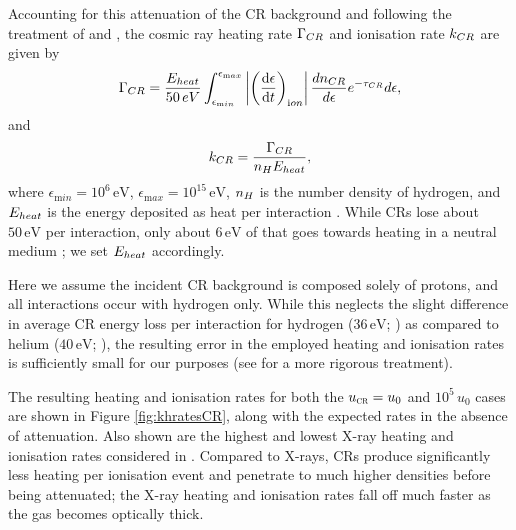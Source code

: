 \documentclass{thesis}
\newcommand{\ev}{\ensuremath{\,\mathrm{eV}}\xspace}
\newcommand{\ucr}{\ensuremath{{u}_{\textsc{cr}}}\xspace}
\begin{document}
Accounting for this attenuation of the CR background and following the treatment of \citet{StacyBromm2007} and \citet{InayoshiOmukai2011}, the cosmic ray heating rate $\Gamma_{\mathrm \small CR}$ and ionisation rate $k_{\mathrm \small CR}$ are given by
\begin{equation}
\Gamma_{\mathrm \small CR} = 
    \frac{ E_{\mathrm \small heat}}{50\,{\mathrm \small eV}} 
    \int_{\epsilon_{\mathrm min}}^{\epsilon_{\mathrm max}} 
    \left| \left( \frac{{\mathrm d}\epsilon} {{\mathrm d}t} \right)_{\mathrm ion} \right|
    \frac{dn_{\mathrm \tiny CR}}{d\epsilon} e^{-\tau_{\mathrm \small CR}} d\epsilon,
\end{equation}
and 
\begin{equation}
k_{\mathrm \small CR} = \frac{\Gamma_{\mathrm \small CR}}{ n_{\mathrm \small H} E_{\mathrm \small heat}},
\end{equation}
where $\epsilon_{\mathrm min} = 10^6\ev$, $\epsilon_{\mathrm max}= 10^{15}\ev$, $n_{\mathrm \small H}$ is the number density of hydrogen, and $E_{\mathrm \small heat}$ is the energy deposited as heat per interaction \citep{Schlickeiser2002}.
While CRs lose about $50\ev$ per interaction, only about $6\ev$ of that goes towards heating in a neutral medium \citep{SpitzerScott1969,ShullvanSteenberg1985}; we set $E_{\mathrm \small heat}$ accordingly.

Here we assume the incident CR background is composed solely of protons, and all interactions occur with hydrogen only.  
While this neglects the slight difference in average CR energy loss per interaction for hydrogen ($36\ev$; \citealt{BakkerSegre1951}) as compared to helium ($40\ev$; \citealt{WeissBernstein1956}), the resulting error in the employed heating and ionisation rates is sufficiently small for our purposes (see \citealt{JascheCiardiEnsslin2007} for a more rigorous treatment). 

The resulting heating and ionisation rates for both the $\ucr=u_0$ and $10^5\,u_0$ cases are shown in Figure \ref{fig:khratesCR}, along with the expected rates in the absence of attenuation.
Also shown are the highest and lowest X-ray heating and ionisation rates considered in \citet{Hummeletal2015}. 
Compared to X-rays, CRs produce significantly less heating per ionisation event and penetrate to much higher densities before being attenuated; the X-ray heating and ionisation rates fall off much faster as the gas becomes optically thick.
\end{document}
